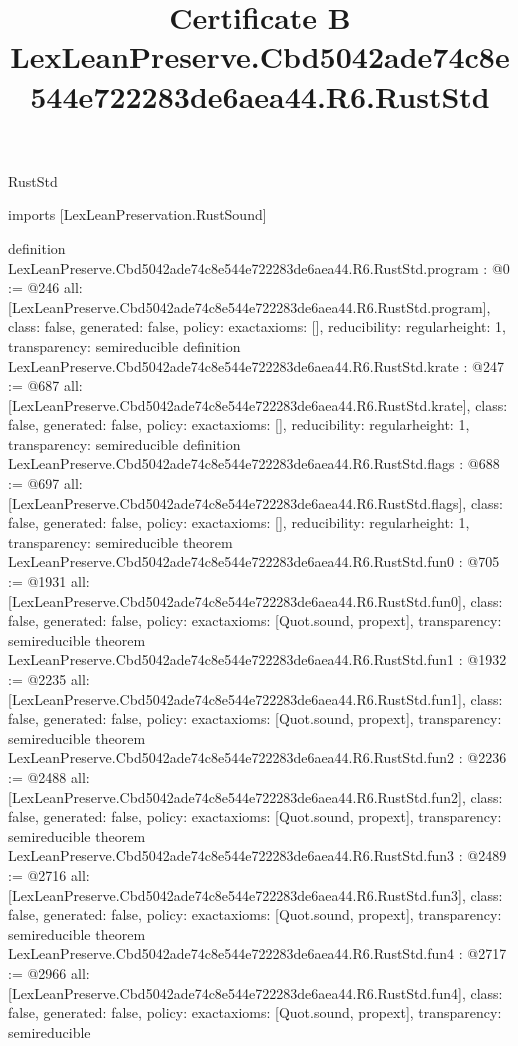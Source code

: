 \begin{lexlean}{RustStd}
\title{Certificate B LexLeanPreserve.Cbd5042ade74c8e544e722283de6aea44.R6.RustStd}
\begin{coremodule}
imports [LexLeanPreservation.RustSound]

definition LexLeanPreserve.Cbd5042ade74c8e544e722283de6aea44.R6.RustStd.program : @0 := @246 {
  all: [LexLeanPreserve.Cbd5042ade74c8e544e722283de6aea44.R6.RustStd.program],
  class: false,
  generated: false,
  policy: exact{axioms: []},
  reducibility: regular{height: 1},
  transparency: semireducible
}
definition LexLeanPreserve.Cbd5042ade74c8e544e722283de6aea44.R6.RustStd.krate : @247 := @687 {
  all: [LexLeanPreserve.Cbd5042ade74c8e544e722283de6aea44.R6.RustStd.krate],
  class: false,
  generated: false,
  policy: exact{axioms: []},
  reducibility: regular{height: 1},
  transparency: semireducible
}
definition LexLeanPreserve.Cbd5042ade74c8e544e722283de6aea44.R6.RustStd.flags : @688 := @697 {
  all: [LexLeanPreserve.Cbd5042ade74c8e544e722283de6aea44.R6.RustStd.flags],
  class: false,
  generated: false,
  policy: exact{axioms: []},
  reducibility: regular{height: 1},
  transparency: semireducible
}
theorem LexLeanPreserve.Cbd5042ade74c8e544e722283de6aea44.R6.RustStd.fun0 : @705 := @1931 {
  all: [LexLeanPreserve.Cbd5042ade74c8e544e722283de6aea44.R6.RustStd.fun0],
  class: false,
  generated: false,
  policy: exact{axioms: [Quot.sound, propext]},
  transparency: semireducible
}
theorem LexLeanPreserve.Cbd5042ade74c8e544e722283de6aea44.R6.RustStd.fun1 : @1932 := @2235 {
  all: [LexLeanPreserve.Cbd5042ade74c8e544e722283de6aea44.R6.RustStd.fun1],
  class: false,
  generated: false,
  policy: exact{axioms: [Quot.sound, propext]},
  transparency: semireducible
}
theorem LexLeanPreserve.Cbd5042ade74c8e544e722283de6aea44.R6.RustStd.fun2 : @2236 := @2488 {
  all: [LexLeanPreserve.Cbd5042ade74c8e544e722283de6aea44.R6.RustStd.fun2],
  class: false,
  generated: false,
  policy: exact{axioms: [Quot.sound, propext]},
  transparency: semireducible
}
theorem LexLeanPreserve.Cbd5042ade74c8e544e722283de6aea44.R6.RustStd.fun3 : @2489 := @2716 {
  all: [LexLeanPreserve.Cbd5042ade74c8e544e722283de6aea44.R6.RustStd.fun3],
  class: false,
  generated: false,
  policy: exact{axioms: [Quot.sound, propext]},
  transparency: semireducible
}
theorem LexLeanPreserve.Cbd5042ade74c8e544e722283de6aea44.R6.RustStd.fun4 : @2717 := @2966 {
  all: [LexLeanPreserve.Cbd5042ade74c8e544e722283de6aea44.R6.RustStd.fun4],
  class: false,
  generated: false,
  policy: exact{axioms: [Quot.sound, propext]},
  transparency: semireducible
}
\end{coremodule}
\end{lexlean}
